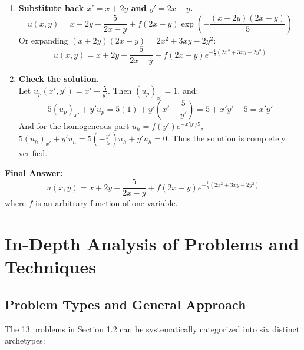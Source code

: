 \documentclass[11pt]{article}
\begin{document}
\begin{enumerate}[label=\textbf{Step \arabic*:}]
    \item \textbf{Substitute back $x' = x + 2y$ and $y' = 2x - y$.} \\
    \[
    u(x, y) = x + 2y - \frac{5}{2x - y} + f(2x - y)\exp\left(-\frac{(x + 2y)(2x - y)}{5}\right)
    \]
    Or expanding $(x + 2y)(2x - y) = 2x^2 + 3xy - 2y^2$:
    \[
    u(x, y) = x + 2y - \frac{5}{2x - y} + f(2x - y)e^{-\frac{1}{5}(2x^2 + 3xy - 2y^2)}
    \]

    \item \textbf{Check the solution.} \\
    Let $u_p(x', y') = x' - \frac{5}{y'}$. Then $(u_p)_{x'} = 1$, and:
    \[
    5(u_p)_{x'} + y'u_p = 5(1) + y'\left(x' - \frac{5}{y'}\right) = 5 + x'y' - 5 = x'y'
    \]
    And for the homogeneous part $u_h = f(y')e^{-x'y'/5}$, $5(u_h)_{x'} + y'u_h = 5\left(-\frac{y'}{5}\right)u_h + y'u_h = 0$. Thus the solution is completely verified.
\end{enumerate}

\noindent\textbf{Final Answer:}
\[
\boxed{u(x, y) = x + 2y - \frac{5}{2x - y} + f(2x - y)e^{-\frac{1}{5}(2x^2 + 3xy - 2y^2)}}
\]
where $f$ is an arbitrary function of one variable.

\newpage
\section{In-Depth Analysis of Problems and Techniques}

\subsection{Problem Types and General Approach}
The 13 problems in Section 1.2 can be systematically categorized into six distinct archetypes:
\end{document}
